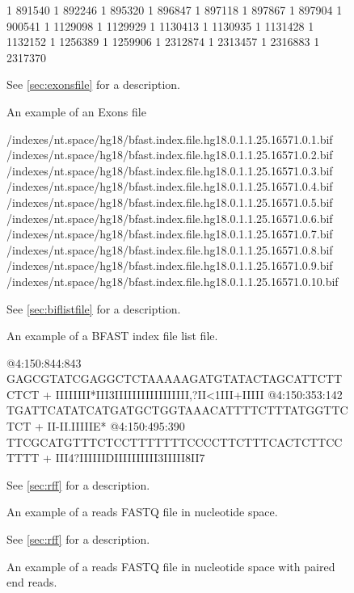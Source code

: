 \documentclass[a4paper,12pt]{book}
\newcommand{\rFF}{reads FASTQ file}
\newcommand{\BIF}{BFAST index file} %
\begin{document}
\begin{figure}
	\centering
	\begin{boxedverbatim}
	1	891540	1	892246
	1	895320	1	896847
	1	897118	1	897867
	1	897904	1	900541
	1	1129098	1	1129929
	1	1130413	1	1130935
	1	1131428	1	1132152
	1	1256389	1	1259906
	1	2312874	1	2313457
	1	2316883	1	2317370
	\end{boxedverbatim}
	\caption{
	An example of an Exons file
	}{
	See \autoref{sec:exonsfile} for a description.
	\label{fig:exonsfile}}
\end{figure}
\begin{figure}
	\centering
	\begin{boxedverbatim}
	/indexes/nt.space/hg18/bfast.index.file.hg18.0.1.1.25.16571.0.1.bif
	/indexes/nt.space/hg18/bfast.index.file.hg18.0.1.1.25.16571.0.2.bif
	/indexes/nt.space/hg18/bfast.index.file.hg18.0.1.1.25.16571.0.3.bif
	/indexes/nt.space/hg18/bfast.index.file.hg18.0.1.1.25.16571.0.4.bif
	/indexes/nt.space/hg18/bfast.index.file.hg18.0.1.1.25.16571.0.5.bif
	/indexes/nt.space/hg18/bfast.index.file.hg18.0.1.1.25.16571.0.6.bif
	/indexes/nt.space/hg18/bfast.index.file.hg18.0.1.1.25.16571.0.7.bif
	/indexes/nt.space/hg18/bfast.index.file.hg18.0.1.1.25.16571.0.8.bif
	/indexes/nt.space/hg18/bfast.index.file.hg18.0.1.1.25.16571.0.9.bif
	/indexes/nt.space/hg18/bfast.index.file.hg18.0.1.1.25.16571.0.10.bif
	\end{boxedverbatim}
	\caption{
	An example of a \BIF{} list file.
	}{
	See \autoref{sec:biflistfile} for a description.
	\label{fig:biflistfile}}
\end{figure}
\begin{figure}
	\centering
	\begin{boxedverbatim}
	@4:150:844:843
	GAGCGTATCGAGGCTCTAAAAAGATGTATACTAGCATTCTTCTCT
	+
	IIIIIIII*III3IIIIIIIIIIIIIIIII,?II<1III+IIIII
	@4:150:353:142
	TGATTCATATCATGATGCTGGTAAACATTTTCTTTATGGTTCTCT
	+
	II-II.IIIIIE*%
	@4:150:495:390
	TTCGCATGTTTCTCCTTTTTTTCCCCTTCTTTCACTCTTCCTTTT
	+
	III4?IIIIIIDIIIIIIIIII3IIIII8II7%
	\end{boxedverbatim}
	\caption{
	An example of a \rFF{} in nucleotide space.
	}{
	See \autoref{sec:rff} for a description.
	\label{fig:ntreads}}
\end{figure}
\begin{figure}
	\centering
	\caption{
	An example of a \rFF{} in nucleotide space with paired end reads.
	}{
	See \autoref{sec:rff} for a description.
	\label{fig:ntreadspairedend}}
\end{figure}
\end{document}
